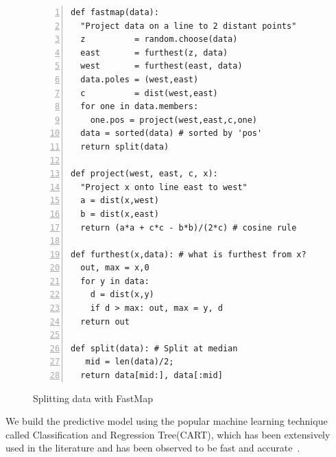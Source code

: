 \documentclass{sig-alternative}
\begin{document}
\begin{figure}[!t] 
\begin{minipage}{3.2in}
\begin{lstlisting}[mathescape,frame=l,numbers=left]
def fastmap(data): 
  "Project data on a line to 2 distant points"
  z          = random.choose(data)
  east       = furthest(z, data)
  west       = furthest(east, data)
  data.poles = (west,east)
  c          = dist(west,east)     
  for one in data.members: 
    one.pos = project(west,east,c,one)
  data = sorted(data) # sorted by 'pos'
  return split(data)

def project(west, east, c, x): 
  "Project x onto line east to west"
  a = dist(x,west)
  b = dist(x,east)
  return (a*a + c*c - b*b)/(2*c) # cosine rule

def furthest(x,data): # what is furthest from x?
  out, max = x,0
  for y in data:
    d = dist(x,y)
    if d > max: out, max = y, d
  return out

def split(data): # Split at median
   mid = len(data)/2; 
  return data[mid:], data[:mid]
\end{lstlisting}
\caption{Splitting data with FastMap}
\label{fig:fastmapCode}  
\end{minipage}
\end{figure}

We build the predictive model using the popular machine learning technique called Classification and Regression Tree(CART), which has been extensively used in the literature and has been observed to be fast and accurate~\cite{guo2013variability}.
\end{document}
